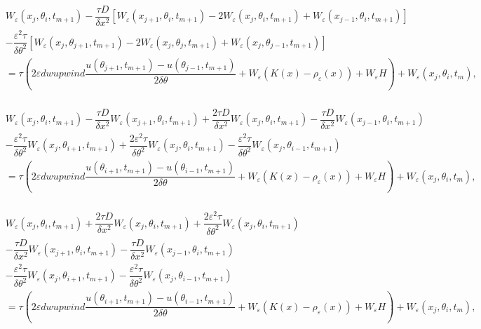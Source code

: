 \documentclass[preprint]{elsarticle}
\numberwithin{equation}{section}
\begin{document}
 \begin{equation}
\begin{aligned}
& W_\varepsilon(x_j, \theta_i, t_{m+1}) -\dfrac{\tau D}{\delta x^2}[W_\varepsilon(x_{j+1},\theta_i, t_{m+1}) - 2W_\varepsilon(x_j,\theta_i,t_{m+1}) + W_\varepsilon(x_{j-1}, \theta_i, t_{m+1})] \\
&-\dfrac{\varepsilon^2\tau}{\delta\theta^2}[W_\varepsilon(x_j,\theta_{j+1},t_{m+1})-2W_\varepsilon(x_j,\theta_{j}, t_{m+1})+W_\varepsilon(x_j,\theta_{j-1}, t_{m+1})] \\
&= \tau(2\varepsilon dwupwind\dfrac{u(\theta_{j+1},t_{m+1}) -u(\theta_{j-1},t_{m+1})}{2\delta\theta}
+ W_\varepsilon (K(x)-\rho_\varepsilon(x)) + W_\varepsilon H) + W_\varepsilon(x_j, \theta_i, t_m),\\
\end{aligned}
\end{equation}

 \begin{equation}
\begin{aligned}
& W_\varepsilon(x_j, \theta_i, t_{m+1}) -\dfrac{\tau D}{\delta x^2}W_\varepsilon(x_{j+1},\theta_i, t_{m+1}) + \dfrac{2\tau D}{\delta x^2} W_\varepsilon(x_j,\theta_i,t_{m+1}) -\dfrac{\tau D}{\delta x^2} W_\varepsilon(x_{j-1}, \theta_i, t_{m+1}) \\
&-\dfrac{\varepsilon^2\tau}{\delta\theta^2}W_\varepsilon(x_j,\theta_{i+1},t_{m+1})+\dfrac{2\varepsilon^2\tau}{\delta\theta^2}W_\varepsilon(x_j,\theta_{i}, t_{m+1})-\dfrac{\varepsilon^2\tau}{\delta\theta^2}W_\varepsilon(x_j,\theta_{i-1}, t_{m+1}) \\
&= \tau(2\varepsilon dwupwind\dfrac{u(\theta_{i+1},t_{m+1}) -u(\theta_{i-1},t_{m+1})}{2\delta\theta}
+ W_\varepsilon (K(x)-\rho_\varepsilon(x)) + W_\varepsilon H) + W_\varepsilon(x_j, \theta_i, t_m),\\
\end{aligned}
\end{equation}

 \begin{equation}
\begin{aligned}
& W_\varepsilon(x_j, \theta_i, t_{m+1}) + \dfrac{2\tau D}{\delta x^2} W_\varepsilon(x_j,\theta_i,t_{m+1}) +\dfrac{2\varepsilon^2\tau}{\delta\theta^2}W_\varepsilon(x_j,\theta_{i}, t_{m+1})\\
 & -\dfrac{\tau D}{\delta x^2}W_\varepsilon(x_{j+1},\theta_i, t_{m+1}) -\dfrac{\tau D}{\delta x^2} W_\varepsilon(x_{j-1}, \theta_i, t_{m+1}) \\
&-\dfrac{\varepsilon^2\tau}{\delta\theta^2}W_\varepsilon(x_j,\theta_{i+1},t_{m+1})-\dfrac{\varepsilon^2\tau}{\delta\theta^2}W_\varepsilon(x_j,\theta_{i-1}, t_{m+1}) \\
&= \tau(2\varepsilon dwupwind\dfrac{u(\theta_{i+1},t_{m+1}) -u(\theta_{i-1},t_{m+1})}{2\delta\theta}
+ W_\varepsilon (K(x)-\rho_\varepsilon(x)) + W_\varepsilon H) + W_\varepsilon(x_j, \theta_i, t_m),\\
\end{aligned}
\end{equation}
\end{document}
